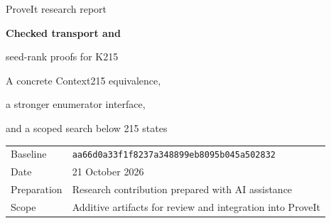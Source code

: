 \documentclass[11pt]{article}
\begin{document}
\hypersetup{pageanchor=false}
\begin{titlepage}
\color{navy}\sffamily
{\Large ProveIt research report\par}
\vspace{18mm}
{\Huge\bfseries Checked transport and\par seed-rank proofs for K215\par}
\vspace{8mm}
{\Large A concrete Context215 equivalence,\par a stronger enumerator interface,\par and a scoped search below 215 states\par}
\vspace{14mm}
\normalfont\color{black}
\begin{abstract}
This report advances proof simplification at a pinned current ProveIt snapshot. It supplies a concrete Rocq/Coq transport proof for the five-row Context215 patch, based on a seven-state tape invariant and an exact simulation of entire tapes. The invariant's nontrivial preservation obligations are restricted to eleven incoming rows. A separate checked refactor replaces three scheduler inductions by one natural-valued rank and proves completeness of the numerical enumerator from every initial state; soundness retains its necessary derivability invariant. Local opacity removes unnecessary normalization of arithmetic formula codes. The report compares alternative 215-state candidates without conflating paper proofs, local kernel checks, and complete ZFC endpoints. An expanded finite search admits both-branch state folds, checks 22 literal tables, and exhibits a precise valid-frame counterexample to a tempting 214-state construction. No verified machine with 214 or fewer states is claimed. Source files, patches, literal tables, independent audits, build receipts, and reproducible search artifacts accompany the report.
\end{abstract}
\vfill
\begin{tabular}{@{}ll@{}}
Baseline & \texttt{aa66d0a33f1f8237a348899eb8095b045a502832}\\
Date & 21 October 2026\\
Preparation & Research contribution prepared with AI assistance\\
Scope & Additive artifacts for review and integration into ProveIt
\end{tabular}
\end{titlepage}
\hypersetup{pageanchor=true}
\tableofcontents
\newpage
\end{document}

